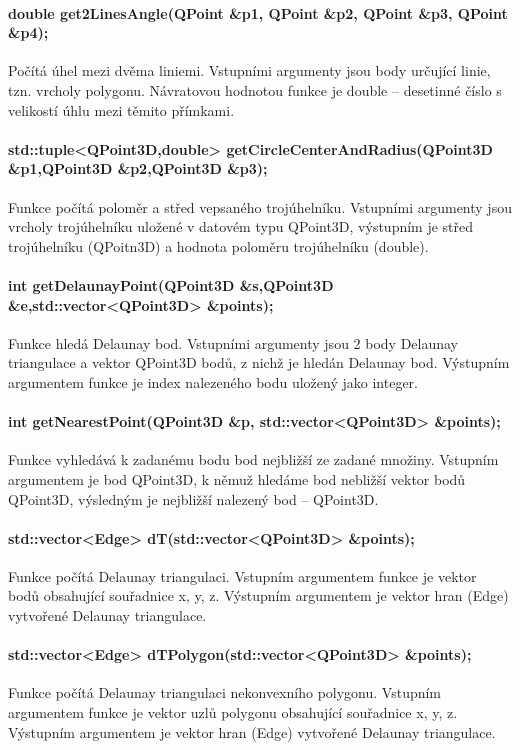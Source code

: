 \documentclass[11pt]{article}
\begin{document}
\paragraph{double get2LinesAngle(QPoint \&p1, QPoint \&p2, QPoint \&p3, QPoint \&p4);}
Počítá úhel mezi dvěma liniemi. Vstupními argumenty jsou body určující linie, tzn. vrcholy polygonu. Návratovou hodnotou funkce je double – desetinné číslo s velikostí úhlu mezi těmito přímkami.  

\paragraph{std::tuple<QPoint3D,double> getCircleCenterAndRadius(QPoint3D \&p1,QPoint3D \&p2,QPoint3D \&p3);}
Funkce počítá poloměr a střed vepsaného trojúhelníku. Vstupními argumenty jsou vrcholy trojúhelníku uložené v datovém typu QPoint3D, výstupním je střed trojúhelníku (QPoitn3D) a hodnota poloměru trojúhelníku (double).

\paragraph {int getDelaunayPoint(QPoint3D \&s,QPoint3D \&e,std::vector<QPoint3D> \&points);}
Funkce hledá Delaunay bod. Vstupními argumenty jsou 2 body Delaunay triangulace a vektor QPoint3D bodů, z nichž je hledán Delaunay bod. Výstupním argumentem funkce je index nalezeného bodu uložený jako integer.

\paragraph {int getNearestPoint(QPoint3D \&p, std::vector<QPoint3D> \&points);}
Fun\-kce vyhledává k zadanému bodu bod nejbližší ze zadané množiny. Vstupním argumentem je bod QPoint3D, k němuž hledáme bod nebližší vektor bodů QPoint3D, výsledným je nejbližší nalezený bod – QPoint3D.

\paragraph{std::vector<Edge> dT(std::vector<QPoint3D> \&points);}
Funkce počítá De\-launay triangulaci. Vstupním argumentem funkce je vektor bodů obsahující souřadnice x, y, z. Výstupním argumentem je vektor hran (Edge) vytvořené 
Delaunay triangulace.

\paragraph {std::vector<Edge> dTPolygon(std::vector<QPoint3D> \&points);}
Funkce počítá Delaunay triangulaci nekonvexního polygonu. Vstupním argumentem funkce je vektor uzlů polygonu obsahující souřadnice x, y, z. Výstupním argumentem je vektor hran (Edge) vytvořené Delaunay triangulace.
\end{document}
